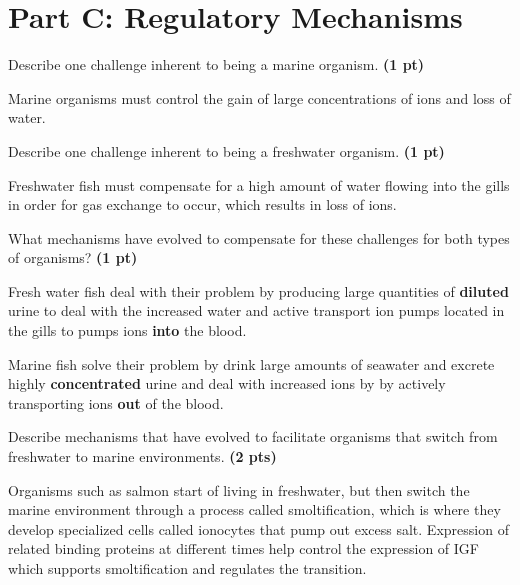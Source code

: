 \documentclass[12pt,a4paper]{article}
\begin{document}
\section*{Part C: Regulatory Mechanisms}
\begin{enumerate}[font=\bfseries, wide, resume]
    {\color{under}\item Describe one challenge inherent to being a marine organism.  \textbf{(1 pt)}}

    Marine organisms must control the gain of large concentrations of ions and loss of water.

    {\color{under}\item Describe one challenge inherent to being a freshwater organism.  \textbf{(1 pt)}}

    Freshwater fish must compensate for a high amount of water flowing into the gills in order for gas exchange to occur, which results in loss of ions.

    {\color{under}\item What mechanisms have evolved to compensate for these challenges for both types of organisms?  \textbf{(1 pt)}}

    Fresh water fish deal with their problem by producing large quantities of \textbf{diluted} urine to deal with the increased water and active transport ion pumps located in the gills to pumps ions \textbf{into} the blood.

    Marine fish solve their problem by drink large amounts of seawater and excrete highly \textbf{concentrated} urine and deal with increased ions by by actively transporting ions \textbf{out} of the blood. 

    {\color{under}\item Describe mechanisms that have evolved to facilitate organisms that switch from freshwater to marine environments. \textbf{(2 pts)}}

    Organisms such as salmon start of living in freshwater, but then switch the marine environment through a process called smoltification, which is where they develop specialized cells called ionocytes that pump out excess salt. Expression of related binding proteins at different times help control the expression of IGF which supports smoltification and regulates the transition.

\end{enumerate}
\end{document}
